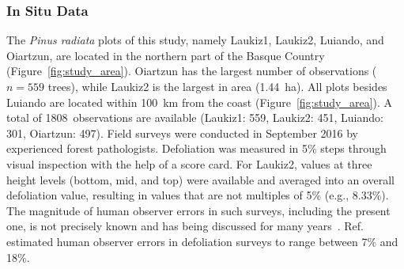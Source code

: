 \documentclass[remotesensing,article,accept,moreauthors,pdftex]{Definitions/mdpi}
\begin{document}
\subsubsection{In Situ Data}

The \textit{Pinus radiata} plots of this study, namely Laukiz1, Laukiz2, Luiando, and Oiartzun, are located in the northern part of the Basque Country (Figure~\ref{fig:study_area}).
Oiartzun has the largest number of observations ($n = 559$ trees), while Laukiz2 is the largest in area (1.44~ha).
All plots besides Luiando are located within 100~km from the coast (Figure~\ref{fig:study_area}).
A total of 1808~observations are available (Laukiz1: 559, Laukiz2: 451, Luiando: 301, Oiartzun: 497).
Field surveys were conducted in September 2016 by experienced forest pathologists.
Defoliation was measured in 5\% steps through visual inspection with the help of a score card.
For Laukiz2, values at three height levels (bottom, mid, and top) were available and averaged into an overall defoliation value, resulting in values that are not multiples of 5\% (e.g., 8.33\%).
The magnitude of human observer errors in such surveys, including the present one, is not precisely known and has being discussed for many years~\cite{innes1993}.
Ref.~\cite{maclean1982} estimated human observer errors in defoliation surveys to range between 7\% and 18\%.
\end{document}
